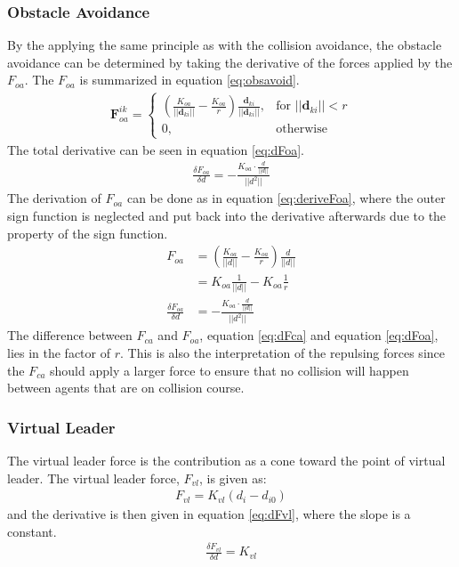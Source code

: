\subsubsection{Obstacle Avoidance}
By the applying the same principle as with the collision avoidance, the obstacle avoidance can be determined by taking the derivative of the forces applied by the $F_{oa}$. The $F_{oa}$ is summarized in equation \ref{eq:obsavoid}.
\begin{align}
    \mathbf{F}_{oa}^{ik}= 
\begin{cases}
    \left( \frac{K_{oa}}{||\mathbf{d}_{ki}||}-\frac{K_{oa}}{r}\right)
    \frac{\mathbf{d}_{{ki}}}{||\mathbf{d}_{ki}||},& \text{for } ||\mathbf{d}_{ki}||<r\\
    0,              & \text{otherwise}
\end{cases}
\label{eq:obsavoid}
\end{align}
The total derivative can be seen in equation \ref{eq:dFoa}.
\begin{align}
\frac{\delta F_{oa}}{\delta d} = -\frac{K_{oa}\cdot \frac{d}{||d||}}{||d^2||}
\label{eq:dFoa}
\end{align}
The derivation of $F_{oa}$ can be done as in equation \ref{eq:deriveFoa}, where the outer sign function is neglected and put back into the derivative afterwards due to the property of the sign function.
\begin{align}
F_{oa} &= \left(\frac{K_{oa}}{||d||}-\frac{K_{oa}}{r}\right)\frac{d}{||d||}\\
&= K_{oa}\frac{1}{||d||}-K_{oa}\frac{1}{r}\\
\frac{\delta F_{oa}}{\delta d} &= -\frac{K_{oa}\cdot \frac{d}{||d||}}{||d^2||}
\label{eq:deriveFoa}
\end{align}
The difference between $F_{ca}$ and $F_{oa}$, equation \ref{eq:dFca} and equation \ref{eq:dFoa}, lies in the factor of $r$. This is also the interpretation of the repulsing forces since the $F_{ca}$ should apply a larger force to ensure that no collision will happen between agents that are on collision course.

\subsubsection{Virtual Leader}
The virtual leader force is the contribution as a cone toward the point of virtual leader. The virtual leader force, $F_{vl}$, is given as:
\begin{align}
F_{vl} = K_{vl}(d_i-d_{i0})
\end{align}
and the derivative is then given in equation \ref{eq:dFvl}, where the slope is a constant.
\begin{align}
\frac{\delta F_{vl}}{\delta d} = K_{vl}
\label{eq:dFvl}
\end{align}

